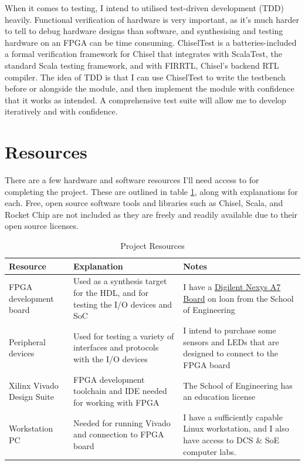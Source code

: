 \documentclass[a4paper,fleqn,12pt]{article}
\begin{document}
When it comes to testing, I intend to utilised test-driven development (TDD) heavily. Functional verification of hardware is very important, as it's much harder to tell to debug hardware designs than software, and synthesising and testing hardware on an FPGA can be time consuming. ChiselTest is a batteries-included a formal verification framework for Chisel that integrates with ScalaTest, the standard Scala testing framework, and with FIRRTL, Chisel's backend RTL compiler.  The idea of TDD is that I can use ChiselTest to write the testbench before or alongside the module, and then implement the module with confidence that it works as intended. A comprehensive test suite will allow me to develop iteratively and with confidence. \cite{chiselverification}


\section{Resources}
There are a few hardware and software resources I'll need access to for completing the project. These are outlined in table \ref{tab:resources}, along with explanations for each. Free, open source software tools and libraries such as Chisel, Scala, and Rocket Chip are not included as they are freely and readily available due to their open source licenses.

\begin{table}[h!]
    \centering
    \begin{tabular}{|p{}|p{}|p{}|}
        \hline
        \textbf{Resource}          & \textbf{Explanation}                                                            & \textbf{Notes}                                                                                                                                   \\ \hline
        FPGA development board     & Used as a synthesis target for the HDL, and for testing the I/O devices and SoC & I have a \href{https://digilent.com/reference/programmable-logic/nexys-a7/start}{Digilent Nexys A7 Board} on loan from the School of Engineering \\ \hline
        Peripheral devices         & Used for testing a variety of interfaces and protocols with the  I/O devices    & I intend to purchase some sensors and LEDs that are designed to connect to the FPGA board                                                        \\ \hline
        Xilinx Vivado Design Suite & FPGA development toolchain and IDE needed for working with FPGA                 & The School of Engineering has an education license                                                                                               \\ \hline
        Workstation PC             & Needed for running Vivado and connection to FPGA board                          & I have a sufficiently capable Linux workstation, and I also have access to DCS \& SoE computer labs.                                             \\ \hline
    \end{tabular}
    \caption{Project Resources}
    \label{tab:resources}
\end{table}
\end{document}
